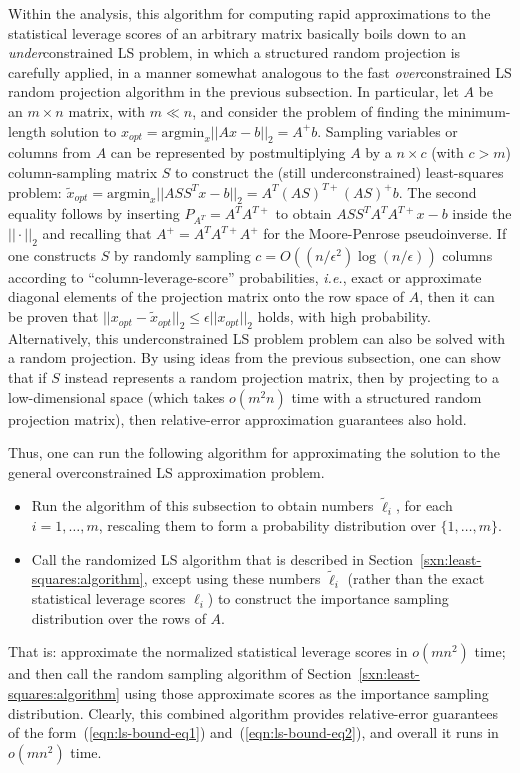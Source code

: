 \documentclass[twoside]{article}
\newcommand{\argmin}{\text{argmin}}
\begin{document}
Within the analysis, this algorithm for computing rapid approximations to 
the statistical leverage scores of an arbitrary matrix basically boils down 
to an \emph{under}constrained LS problem, in which a structured random 
projection is carefully applied, in a manner somewhat analogous to the fast 
\emph{over}constrained LS random projection algorithm in the previous 
subsection.
In particular, let $A$ be an $m \times n$ matrix, with $m \ll n$, and 
consider the problem of finding the minimum-length solution to
$ x_{opt} = \argmin_{x}||Ax-b||_2 = A^+b$.
Sampling variables or columns from $A$ can be represented by postmultiplying
$A$ by a $n \times c$ (with $c>m$) column-sampling matrix $S$ to
construct the (still underconstrained) least-squares problem:
$ \tilde{x}_{opt} = \argmin_{x}||ASS^Tx-b||_2 = A^T(AS)^{T+}(AS)^{+}b $.
The second equality follows by inserting $P_{A^T}=A^TA^{T+}$ to obtain
$ASS^TA^TA^{T+}x-b$ inside the $||\cdot||_2$ and recalling that
$A^+=A^TA^{T+}A^+$ for the Moore-Penrose pseudoinverse.
If one constructs $S$ by randomly sampling 
$c=O((n/\epsilon^2) \log(n /\epsilon))$ columns
according to ``column-leverage-score'' probabilities, \emph{i.e.}, exact or approximate
diagonal elements of the projection matrix onto the row space of $A$, then it can
be proven that $||x_{opt}-\tilde{x}_{opt}||_2 \le \epsilon||x_{opt}||_2$
holds, with high probability.
Alternatively, this underconstrained LS problem problem can also be solved 
with a random projection.
By using ideas from the previous subsection, one can show that if $S$ 
instead represents a random projection matrix, then by projecting to a 
low-dimensional space (which takes $o(m^2n)$ time with  a structured random 
projection matrix), then relative-error approximation guarantees also hold.

Thus, one can run the following algorithm for approximating the solution to 
the general overconstrained LS approximation problem.
\begin{itemize}
\item
Run the algorithm of this subsection to obtain numbers
$\tilde{\ell}_i $, for each $i = 1,\ldots,m$, rescaling them to form a 
probability distribution over $\{1,\ldots,m\}$.
\item
Call the randomized LS algorithm that is described in 
Section~\ref{sxn:least-squares:algorithm}, except using these numbers 
$\tilde{\ell}_i $
(rather than the exact statistical leverage scores $\ell_i $) to construct the importance 
sampling distribution over the rows of $A$.
\end{itemize}
That is: approximate the normalized statistical leverage scores in $o(mn^2)$ 
time; and then call the random sampling algorithm of 
Section~\ref{sxn:least-squares:algorithm} using those approximate scores 
as the importance sampling distribution.  
Clearly, this combined algorithm provides relative-error guarantees of the 
form~(\ref{eqn:ls-bound-eq1}) and~(\ref{eqn:ls-bound-eq2}), and overall it 
runs in $o(mn^2)$ time.
\end{document}
